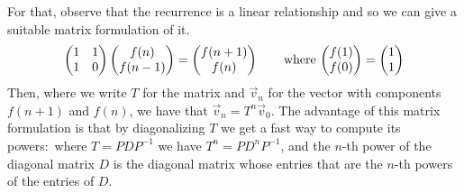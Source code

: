 For that, observe that the recurrence is a linear relationship
and so we can give a suitable matrix formulation of it.
\begin{equation*}
  \begin{pmatrix}
    1  &1   \\
    1  &0
  \end{pmatrix}
  \begin{pmatrix} f(n) \\ f(n-1) \end{pmatrix}
  =
  \begin{pmatrix} f(n+1) \\ f(n) \end{pmatrix}
  \qquad\text{where $\begin{pmatrix} f(1) \\ f(0) \end{pmatrix}=\begin{pmatrix} 1 \\  1 \end{pmatrix}$}
\end{equation*}  
Then, where we write $T$ for the matrix and 
$\vec{v}_{n}$ for the vector with components $f(n+1)$ and $f(n)$,
we have that $\vec{v}_n=T^n\vec{v}_0$.
The advantage of this matrix formulation is that by diagonalizing $T$ we 
get a fast way to compute its powers:~where $T=PDP^{-1}$ we have 
$T^n=PD^nP^{-1}$, and the $n$-th power of the diagonal matrix $D$ is the 
diagonal matrix whose entries that are the $n$-th powers of 
the entries of $D$.

